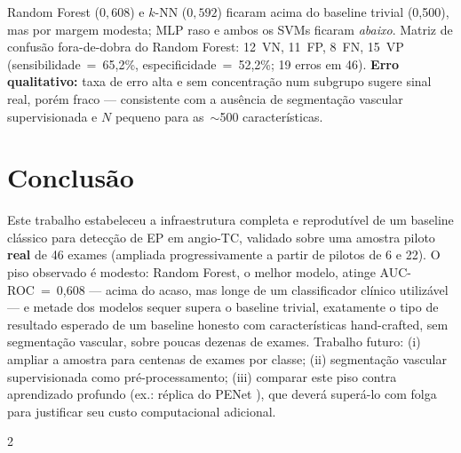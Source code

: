 \documentclass[12pt,a4paper]{article}
\begin{document}
Random Forest ($0,608$) e $k$-NN ($0,592$) ficaram acima do baseline trivial
(0,500), mas por margem modesta; MLP raso e ambos os SVMs ficaram \emph{abaixo}.
Matriz de confusão fora-de-dobra do Random Forest: 12~VN,
11~FP, 8~FN, 15~VP (sensibilidade~=~65,2\%, especificidade~=~52,2\%; 19 erros em
46). \textbf{Erro qualitativo:} taxa de erro alta e sem concentração num subgrupo
sugere sinal real, porém fraco --- consistente com a ausência de segmentação
vascular supervisionada e $N$ pequeno para as~$\sim$500 características.

\section{Conclusão}

Este trabalho estabeleceu a infraestrutura completa e reprodutível de um baseline
clássico para detecção de EP em angio-TC, validado sobre uma amostra piloto
\textbf{real} de 46 exames (ampliada progressivamente a partir de pilotos de 6 e
22). O piso observado é modesto: Random Forest, o melhor modelo, atinge
AUC-ROC~=~0,608 --- acima do acaso, mas longe de um classificador clínico
utilizável --- e metade dos modelos sequer supera o baseline trivial, exatamente o
tipo de resultado esperado de um baseline honesto com características
hand-crafted, sem segmentação vascular, sobre poucas dezenas de exames. Trabalho
futuro: (i) ampliar a amostra para centenas de exames por classe; (ii) segmentação
vascular supervisionada como pré-processamento; (iii) comparar este piso contra
aprendizado profundo (ex.: réplica do PENet \cite{huang2020penet}), que deverá
superá-lo com folga para justificar seu custo computacional adicional.

\let\oldthebibliography\thebibliography
\renewcommand\thebibliography[1]{\oldthebibliography{#1}\setlength{\itemsep}{0pt}\setlength{\parskip}{0pt}}
\setlength{\columnsep}{12pt}
\begin{multicols}{2}
{\tiny


}
\end{multicols}
\end{document}
